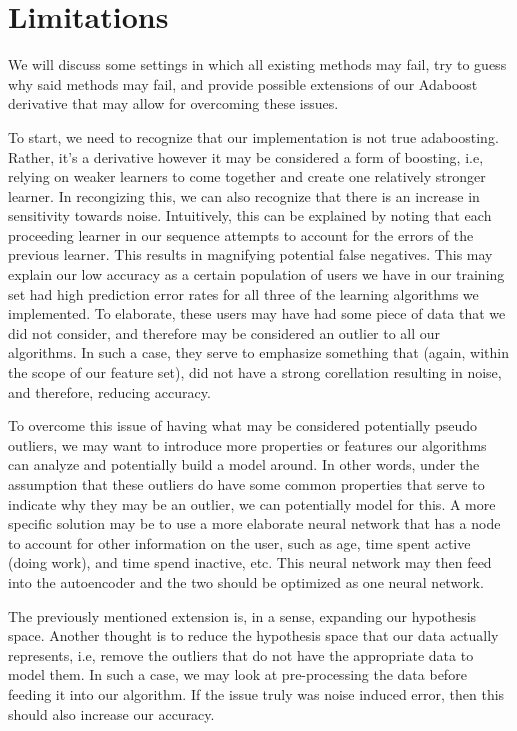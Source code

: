 \documentclass{article}
\begin{document}
    \section{Limitations}
    We will discuss some settings in which all existing methods may fail, try to guess why said methods may fail, and provide possible extensions of our Adaboost derivative that may allow for overcoming these issues.

    To start, we need to recognize that our implementation is not true adaboosting. Rather, it's a derivative however it may be considered a form of boosting, i.e, relying on weaker learners to come together and create one relatively stronger learner. In recongizing this, we can also recognize that there is an increase in sensitivity towards noise. Intuitively, this can be explained by noting that each proceeding learner in our sequence attempts to account for the errors of the previous learner. This results in magnifying potential false negatives. This may explain our low accuracy as a certain population of users we have in our training set had high prediction error rates for all three of the learning algorithms we implemented. To elaborate, these users may have had some piece of data that we did not consider, and therefore may be considered an outlier to all our algorithms. In such a case, they serve to emphasize something that (again, within the scope of our feature set), did not have a strong corellation resulting in noise, and therefore, reducing accuracy.

    To overcome this issue of having what may be considered potentially pseudo outliers, we may want to introduce more properties or features our algorithms can analyze and potentially build a model around. In other words, under the assumption that these outliers do have some common properties that serve to indicate why they may be an outlier, we can potentially model for this. A more specific solution may be to use a more elaborate neural network that has a node to account for other information on the user, such as age, time spent active (doing work), and time spend inactive, etc. This neural network may then feed into the autoencoder and the two should be optimized as one neural network.

    The previously mentioned extension is, in a sense, expanding our hypothesis space. Another thought is to reduce the hypothesis space that our data actually represents, i.e, remove the outliers that do not have the appropriate data to model them. In such a case, we may look at pre-processing the data before feeding it into our algorithm. If the issue truly was noise induced error, then this should also increase our accuracy.
\end{document}
